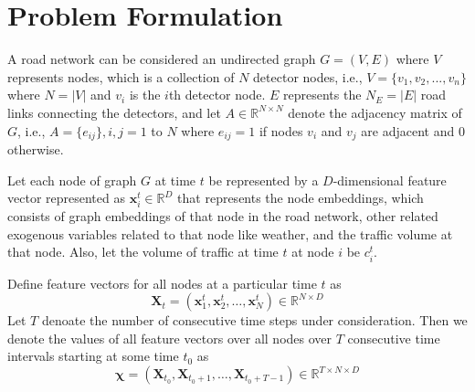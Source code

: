 \section{\textbf{Problem Formulation}}\label{sec:problem-for}

A road network can be considered an undirected graph $G = (V, E)$ where $V$ represents nodes, which is a collection of $N$ detector nodes, i.e., $V=\{v_1,v_2,...,v_n\}$ where $N = |V|$ and $v_i$ is the $i$th detector node. $E$ represents the $N_E = |E|$ road links connecting the detectors, and let $A \in \mathbb{R}^{N \times N}$ denote the adjacency matrix of $G$, i.e., $A = \{e_{ij}\}, i,j=1$ to $N$ where $e_{ij} = 1$ if nodes $v_i$ and $v_j$ are adjacent and $0$ otherwise.

Let each node of graph $G$ at time $t$ be represented by a $D$-dimensional feature vector represented as $\mathbf{x}_i^t \in \mathbb{R}^D$ that represents the node embeddings, which consists of graph embeddings of that node in the road network, other related exogenous variables related to that node like weather, and the traffic volume at that node. Also, let the volume of traffic at time $t$ at node $i$ be $c_i^t$.

Define feature vectors for all nodes at a particular time $t$ as
\begin{equation}
    \mathbf{X}_t = (\mathbf{x}_1^t, \mathbf{x}_2^t, \ldots, \mathbf{x}_N^t) \in \mathbb{R}^{N \times D} \label{eq:X}
\end{equation}
Let $T$ denoate the number of consecutive time steps under consideration. Then we denote the values of all feature vectors over all nodes over $T$ consecutive time intervals starting at some time $t_0$ as
\begin{equation}
    \bm{\chi} = (\mathbf{X}_{t_0}, \mathbf{X}_{t_0+1}, \ldots, \mathbf{X}_{t_0+T-1}) \in \mathbb{R}^{T \times N \times D} \label{eq:chi}
\end{equation}

